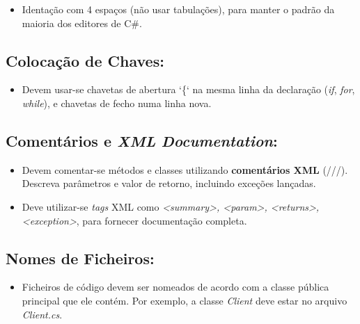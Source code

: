 \documentclass[
]{article}
\begin{document}
\begin{itemize}
\item
  Identação com 4 espaços (não usar tabulações), para manter o padrão da
  maioria dos editores de C\#.
\end{itemize}

\hypertarget{colocauxe7uxe3o-de-chaves}{%
\subsection{Colocação de Chaves:}\label{colocauxe7uxe3o-de-chaves}}

\begin{itemize}
\item
  Devem usar-se chavetas de abertura `\{` na mesma linha da declaração
  (\emph{if}, \emph{for}, \emph{while}), e chavetas de fecho numa linha
  nova.
\end{itemize}

\hypertarget{section-1}{%
\subsection{}\label{section-1}}

\hypertarget{comentuxe1rios-e-xml-documentation}{%
\subsection{\texorpdfstring{Comentários e \emph{XML}
\emph{Documentation}:}{Comentários e XML Documentation:}}\label{comentuxe1rios-e-xml-documentation}}

\begin{itemize}
\item
  Devem comentar-se métodos e classes utilizando \textbf{comentários
  XML} (///). Descreva parâmetros e valor de retorno, incluindo exceções
  lançadas.
\item
  Deve utilizar-se \emph{tags} XML como
  \emph{\textless summary\textgreater, \textless param\textgreater,
  \textless returns\textgreater, \textless exception\textgreater{}},
  para fornecer documentação completa.
\end{itemize}

\hypertarget{nomes-de-ficheiros}{%
\subsection{Nomes de Ficheiros:}\label{nomes-de-ficheiros}}

\begin{itemize}
\item
  Ficheiros de código devem ser nomeados de acordo com a classe pública
  principal que ele contém. Por exemplo, a classe \emph{Client} deve
  estar no arquivo \emph{Client.cs}.
\end{itemize}
\end{document}
